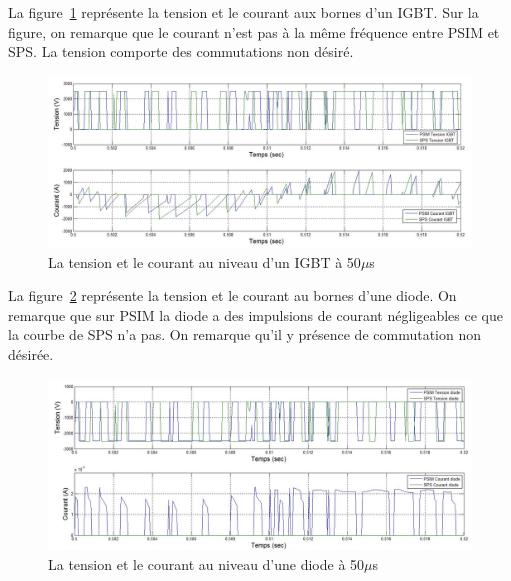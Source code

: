 \documentclass[11pt,letterpaper,final]{report}
\begin{document}
La figure~\ref{AF_3_IGBT50} représente la tension et le courant aux bornes d'un IGBT. Sur la figure, on remarque que le courant n'est pas à la même fréquence entre PSIM et SPS. La tension comporte des commutations non désiré.
\begin{figure}[htb]
\centering
\includegraphics[scale=0.5]{Fig/AFE3LEVEL/50u/IGBT.jpg}
\caption{La tension et le courant au niveau d'un IGBT à 50$\mu$s}
\label{AF_3_IGBT50}
\end{figure}

La figure~\ref{AF_3_DIODE50} représente la tension et le courant au bornes d'une diode. On remarque que sur PSIM la diode a des impulsions de courant négligeables ce que la courbe de SPS n'a pas. On remarque qu'il y présence de commutation non désirée.

\begin{figure}[htb]
\centering
\includegraphics[scale=0.5]{Fig/AFE3LEVEL/50u/DIODE.jpg}
\caption{La tension et le courant au niveau d'une diode à 50$\mu$s}
\label{AF_3_DIODE50}
\end{figure}

\clearpage
\end{document}
